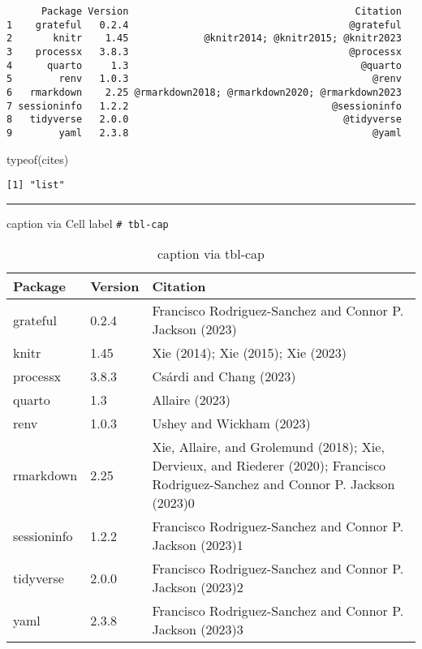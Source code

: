 \documentclass[
  letterpaper,
  DIV=11,
  numbers=noendperiod]{scrartcl}
\newenvironment{Shaded}{\begin{snugshade}}{\end{snugshade}}
\newcommand{\FunctionTok}[1]{\textcolor[rgb]{0.28,0.35,0.67}{#1}}
\newcommand{\NormalTok}[1]{\textcolor[rgb]{0.00,0.23,0.31}{#1}}
\begin{document}
\begin{verbatim}
      Package Version                                       Citation
1    grateful   0.2.4                                      @grateful
2       knitr    1.45             @knitr2014; @knitr2015; @knitr2023
3    processx   3.8.3                                      @processx
4      quarto     1.3                                        @quarto
5        renv   1.0.3                                          @renv
6   rmarkdown    2.25 @rmarkdown2018; @rmarkdown2020; @rmarkdown2023
7 sessioninfo   1.2.2                                   @sessioninfo
8   tidyverse   2.0.0                                     @tidyverse
9        yaml   2.3.8                                          @yaml
\end{verbatim}

\begin{Shaded}
\begin{Highlighting}[]
\FunctionTok{typeof}\NormalTok{(cites)}
\end{Highlighting}
\end{Shaded}

\begin{verbatim}
[1] "list"
\end{verbatim}

\begin{center}\rule{0.5\linewidth}{0.5pt}\end{center}

caption via Cell label \texttt{\#\textbar{}\ tbl-cap}


\begin{longtable}[]{@{}lll@{}}

\caption{\label{tbl-PackageVersions2}caption via tbl-cap}

\tabularnewline

\toprule\noalign{}
Package & Version & Citation \\
\midrule\noalign{}
\endhead
\bottomrule\noalign{}
\endlastfoot
grateful & 0.2.4 & Francisco Rodriguez-Sanchez and Connor P. Jackson (2023) \\
knitr & 1.45 & Xie (2014);
Xie (2015);
Xie (2023) \\
processx & 3.8.3 & Csárdi and Chang (2023) \\
quarto & 1.3 & Allaire (2023) \\
renv & 1.0.3 & Ushey and Wickham (2023) \\
rmarkdown & 2.25 & Xie, Allaire, and Grolemund (2018);
Xie, Dervieux, and Riederer (2020);
Francisco Rodriguez-Sanchez and Connor P. Jackson (2023)0 \\
sessioninfo & 1.2.2 & Francisco Rodriguez-Sanchez and Connor P. Jackson (2023)1 \\
tidyverse & 2.0.0 & Francisco Rodriguez-Sanchez and Connor P. Jackson (2023)2 \\
yaml & 2.3.8 & Francisco Rodriguez-Sanchez and Connor P. Jackson (2023)3 \\

\end{longtable}
\end{document}
